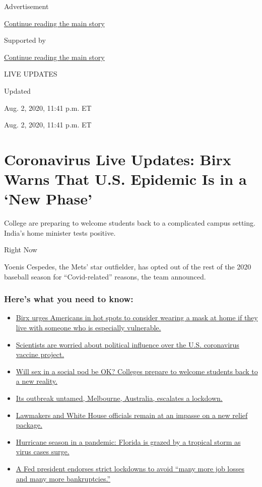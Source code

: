 Advertisement

\protect\hyperlink{after-top}{Continue reading the main story}

Supported by

\protect\hyperlink{after-sponsor}{Continue reading the main story}

LIVE UPDATES

Updated~

Aug. 2, 2020, 11:41 p.m. ET

Aug. 2, 2020, 11:41 p.m. ET

\hypertarget{coronavirus-live-updates-birx-warns-that-us-epidemic-is-in-a-new-phase}{%
\section{Coronavirus Live Updates: Birx Warns That U.S. Epidemic Is in a
`New
Phase'}\label{coronavirus-live-updates-birx-warns-that-us-epidemic-is-in-a-new-phase}}

College are preparing to welcome students back to a complicated campus
setting. India's home minister tests positive.

Right Now

Yoenis Cespedes, the Mets' star outfielder, has opted out of the rest of
the 2020 baseball season for ``Covid-related'' reasons, the team
announced.

\hypertarget{heres-what-you-need-to-know}{%
\subsubsection{Here's what you need to
know:}\label{heres-what-you-need-to-know}}

\begin{itemize}
\tightlist
\item
  \protect\hyperlink{link-4c637647}{Birx urges Americans in hot spots to
  consider wearing a mask at home if they live with someone who is
  especially vulnerable.}
\item
  \protect\hyperlink{link-18bff79b}{Scientists are worried about
  political influence over the U.S. coronavirus vaccine project.}
\item
  \protect\hyperlink{link-79292e3}{Will sex in a social pod be OK?
  Colleges prepare to welcome students back to a new reality.}
\item
  \protect\hyperlink{link-74f9a2b2}{Its outbreak untamed, Melbourne,
  Australia, escalates a lockdown.}
\item
  \protect\hyperlink{link-1a62dbb2}{Lawmakers and White House officials
  remain at an impasse on a new relief package.}
\item
  \protect\hyperlink{link-479653b6}{Hurricane season in a pandemic:
  Florida is grazed by a tropical storm as virus cases surge.}
\item
  \protect\hyperlink{link-709fc51d}{A Fed president endorses strict
  lockdowns to avoid ``many more job losses and many more
  bankruptcies.''}
\end{itemize}

